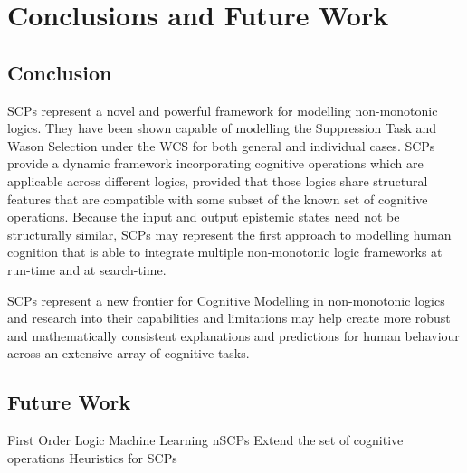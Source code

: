 \chapter{Conclusions and Future Work} \label{chp:conclusion}
\section{Conclusion}
SCPs represent a novel and powerful framework for modelling non-monotonic logics. They have been shown capable of modelling the Suppression Task and Wason Selection under the WCS for both general and individual cases. SCPs provide a dynamic framework incorporating cognitive operations which are applicable across different logics, provided that those logics share structural features that are compatible with some subset of the known set of cognitive operations. Because the input and output epistemic states need not be structurally similar, SCPs may represent the first approach to modelling human cognition that is able to integrate multiple non-monotonic logic frameworks at run-time and at search-time. 

SCPs represent a new frontier for Cognitive Modelling in non-monotonic logics and research into their capabilities and limitations may help create more robust and mathematically consistent explanations and predictions for human behaviour across an extensive array of cognitive tasks.

\section{Future Work}
First Order Logic
Machine Learning
nSCPs
Extend the set of cognitive operations
Heuristics for SCPs
